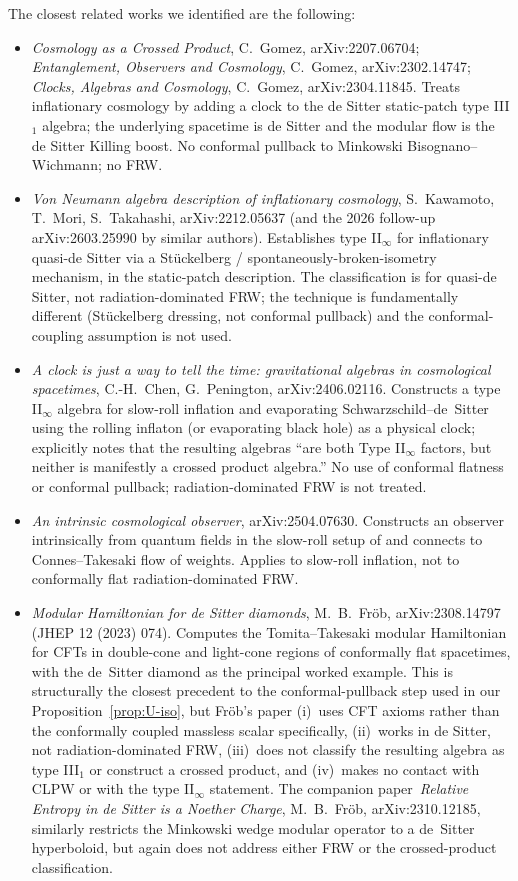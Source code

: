 \documentclass[11pt]{article}
\theoremstyle{definition}
\begin{document}
The closest related works we identified are the following:
\begin{itemize}
\item \emph{Cosmology as a Crossed Product}, C.~Gomez, arXiv:2207.06704; \emph{Entanglement, Observers and Cosmology}, C.~Gomez, arXiv:2302.14747; \emph{Clocks, Algebras and Cosmology}, C.~Gomez, arXiv:2304.11845. Treats inflationary cosmology by adding a clock to the de Sitter static-patch type III$_1$ algebra; the underlying spacetime is de Sitter and the modular flow is the de Sitter Killing boost. No conformal pullback to Minkowski Bisognano--Wichmann; no FRW.
\item \emph{Von Neumann algebra description of inflationary cosmology}, S.~Kawamoto, T.~Mori, S.~Takahashi, arXiv:2212.05637 (and the 2026 follow-up arXiv:2603.25990 by similar authors). Establishes type II$_\infty$ for inflationary quasi-de Sitter via a Stückelberg / spontaneously-broken-isometry mechanism, in the static-patch description. The classification is for quasi-de Sitter, not radiation-dominated FRW; the technique is fundamentally different (Stückelberg dressing, not conformal pullback) and the conformal-coupling assumption is not used.
\item \emph{A clock is just a way to tell the time: gravitational algebras in cosmological spacetimes}, C.-H.~Chen, G.~Penington, arXiv:2406.02116. Constructs a type II$_\infty$ algebra for slow-roll inflation and evaporating Schwarzschild--de~Sitter using the rolling inflaton (or evaporating black hole) as a physical clock; explicitly notes that the resulting algebras ``are both Type II$_\infty$ factors, but neither is manifestly a crossed product algebra.'' No use of conformal flatness or conformal pullback; radiation-dominated FRW is not treated.
\item \emph{An intrinsic cosmological observer}, arXiv:2504.07630. Constructs an observer intrinsically from quantum fields in the slow-roll setup of \cite{ChenPenington2024} and connects to Connes--Takesaki flow of weights. Applies to slow-roll inflation, not to conformally flat radiation-dominated FRW.
\item \emph{Modular Hamiltonian for de Sitter diamonds}, M.~B.~Fröb, arXiv:2308.14797 (JHEP 12 (2023) 074). Computes the Tomita--Takesaki modular Hamiltonian for CFTs in double-cone and light-cone regions of conformally flat spacetimes, with the de~Sitter diamond as the principal worked example. This is structurally the closest precedent to the conformal-pullback step used in our Proposition~\ref{prop:U-iso}, but Fröb's paper (i)~uses CFT axioms rather than the conformally coupled massless scalar specifically, (ii)~works in de Sitter, not radiation-dominated FRW, (iii)~does not classify the resulting algebra as type III$_1$ or construct a crossed product, and (iv)~makes no contact with CLPW or with the type II$_\infty$ statement. The companion paper~\emph{Relative Entropy in de Sitter is a Noether Charge}, M.~B.~Fröb, arXiv:2310.12185, similarly restricts the Minkowski wedge modular operator to a de~Sitter hyperboloid, but again does not address either FRW or the crossed-product classification.

\end{itemize}
\end{document}
